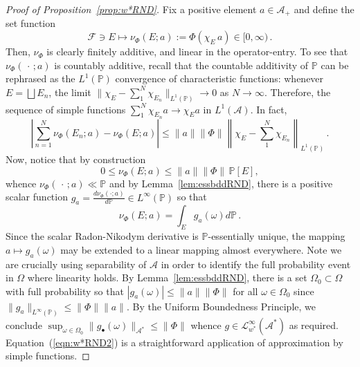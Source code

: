 \documentclass{article}
\newcommand{\A}{\mathcal{A}}
\renewcommand{\P}{\mathbb{P}}
\newcommand{\<}{\langle}
\renewcommand{\>}{\rangle}
\theoremstyle{definition}
\numberwithin{equation}{section}
\begin{document}
\begin{proof}[Proof of Proposition~\ref{prop:w*RND}]
	Fix a positive element $a\in \A_+$ and define the set function 
	\begin{equation}\label{eqn:induced_measure}
		\mathcal{F}\ni E\longmapsto \nu_{\Phi}(E;a) := \Phi(\chi_E\, a)\in [0, \infty)\,.
	\end{equation} Then, $\nu_{\Phi}$ is clearly finitely additive, and linear in the operator-entry. To see that $\nu_{\Phi}(\,\cdot\,;a)$ is countably additive, recall that the countable additivity of $\P$ can be rephrased as the $L^1(\P)$ convergence of characteristic functions: whenever $E= \bigsqcup E_n$, the limit $\|\chi_{E} - \sum_1^N \chi_{E_n}\|_{L^1(\P)} \to 0$ as $N\to \infty$. Therefore, the sequence of simple functions $\sum_1^N \chi_{E_n} a \to \chi_E a$ in $L^1(\A)$. In fact, 
	\[
		\left| \sum_{n=1}^N \nu_{\Phi}(E_n;a) - \nu_{\Phi}(E; a) \right| \le \|a \|\|\Phi\| \left\|\chi_{E} - \sum_1^N \chi_{E_n}\right\|_{L^1(\P)}\,.
	\] Now, notice that by construction
	\[
		0\le \nu_{\Phi}(E;a)\le \|a\| \|\Phi\|\, \P[E],
	\] whence $\nu_{\Phi}(\,\cdot\,;a)\ll \P$ and by Lemma~\ref{lem:essbddRND}, there is a positive scalar function $g_a = \frac{d\nu_{\Phi}(\cdot; a)}{d\P}\in L^\infty(\P)$ so that 
	\[
		\nu_{\Phi}(E; a) = \int_E g_a(\omega) d\P\,.
	\] Since the scalar Radon-Nikodym derivative is $\P$-essentially unique, the mapping $a\mapsto g_a(\omega)$ may be extended to a linear mapping almost everywhere. Note we are crucially using separability of $\A$ in order to identify the full probability event in $\Omega$ where linearity holds.  By Lemma~\ref{lem:essbddRND}, there is a set $\Omega_0\subset \Omega$ with full probability so that $|g_a(\omega)| \le \|a\| \|\Phi\|$ for all $\omega \in \Omega_0$ since $\|g_a\|_{L^\infty(\P)}\le \|\Phi\| \|a\|$. By the Uniform Boundedness Principle, we conclude $\sup_{\omega\in \Omega_0} \|g_{\bullet}(\omega)\|_{\A^*} \le \|\Phi\|$ whence $g\in \mathcal{L}^\infty_{w^*}(\A^*)$ as required. Equation~(\ref{eqn:w*RND2}) is a straightforward application of approximation by simple functions. 
\end{proof}




\end{document}
